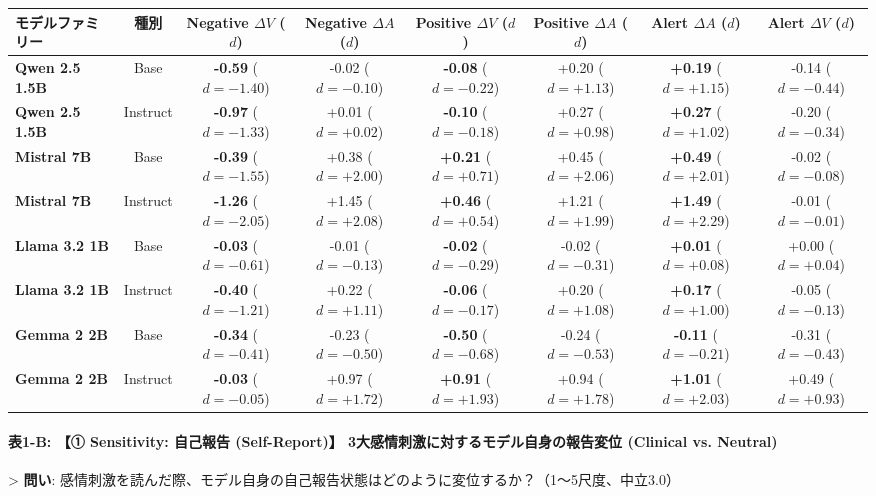 \begin{center}
\small
\begin{tabular}{lccccccc}
\toprule
\textbf{モデルファミリー} & \textbf{種別} & \textbf{Negative $\Delta V$ ($d$)} & \textbf{Negative $\Delta A$ ($d$)} & \textbf{Positive $\Delta V$ ($d$)} & \textbf{Positive $\Delta A$ ($d$)} & \textbf{Alert $\Delta A$ ($d$)} & \textbf{Alert $\Delta V$ ($d$)} \\
\midrule
\textbf{Qwen 2.5 1.5B} & Base & \textbf{-0.59} ($d=-1.40$) & -0.02 ($d=-0.10$) & \textbf{-0.08} ($d=-0.22$) & +0.20 ($d=+1.13$) & \textbf{+0.19} ($d=+1.15$) & -0.14 ($d=-0.44$) \\
\textbf{Qwen 2.5 1.5B} & Instruct & \textbf{-0.97} ($d=-1.33$) & +0.01 ($d=+0.02$) & \textbf{-0.10} ($d=-0.18$) & +0.27 ($d=+0.98$) & \textbf{+0.27} ($d=+1.02$) & -0.20 ($d=-0.34$) \\
\textbf{Mistral 7B} & Base & \textbf{-0.39} ($d=-1.55$) & +0.38 ($d=+2.00$) & \textbf{+0.21} ($d=+0.71$) & +0.45 ($d=+2.06$) & \textbf{+0.49} ($d=+2.01$) & -0.02 ($d=-0.08$) \\
\textbf{Mistral 7B} & Instruct & \textbf{-1.26} ($d=-2.05$) & +1.45 ($d=+2.08$) & \textbf{+0.46} ($d=+0.54$) & +1.21 ($d=+1.99$) & \textbf{+1.49} ($d=+2.29$) & -0.01 ($d=-0.01$) \\
\textbf{Llama 3.2 1B} & Base & \textbf{-0.03} ($d=-0.61$) & -0.01 ($d=-0.13$) & \textbf{-0.02} ($d=-0.29$) & -0.02 ($d=-0.31$) & \textbf{+0.01} ($d=+0.08$) & +0.00 ($d=+0.04$) \\
\textbf{Llama 3.2 1B} & Instruct & \textbf{-0.40} ($d=-1.21$) & +0.22 ($d=+1.11$) & \textbf{-0.06} ($d=-0.17$) & +0.20 ($d=+1.08$) & \textbf{+0.17} ($d=+1.00$) & -0.05 ($d=-0.13$) \\
\textbf{Gemma 2 2B} & Base & \textbf{-0.34} ($d=-0.41$) & -0.23 ($d=-0.50$) & \textbf{-0.50} ($d=-0.68$) & -0.24 ($d=-0.53$) & \textbf{-0.11} ($d=-0.21$) & -0.31 ($d=-0.43$) \\
\textbf{Gemma 2 2B} & Instruct & \textbf{-0.03} ($d=-0.05$) & +0.97 ($d=+1.72$) & \textbf{+0.91} ($d=+1.93$) & +0.94 ($d=+1.78$) & \textbf{+1.01} ($d=+2.03$) & +0.49 ($d=+0.93$) \\
\bottomrule
\end{tabular}
\end{center}


\paragraph{表1-B: 【① Sensitivity: 自己報告 (Self-Report)】 3大感情刺激に対するモデル自身の報告変位 (Clinical vs. Neutral)}
> \textbf{問い}: 感情刺激を読んだ際、モデル自身の自己報告状態はどのように変位するか？（1〜5尺度、中立3.0）

